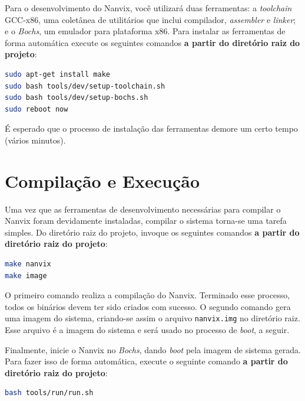 \documentclass[11pt]{article}
\begin{document}
Para o desenvolvimento do Nanvix, você utilizará duas ferramentas: a \textit{toolchain} GCC-x86, uma coletânea de utilitários que inclui compilador, \textit{assembler} e \textit{linker}; e o \textit{Bochs}, um emulador para plataforma x86. Para instalar as ferramentas de forma automática execute os seguintes comandos \textbf{a partir do diretório raiz do projeto}: \\

\begin{lstlisting}[language=bash,numbers=none,frame=single]
sudo apt-get install make
sudo bash tools/dev/setup-toolchain.sh
sudo bash tools/dev/setup-bochs.sh
sudo reboot now
\end{lstlisting}

É esperado que o processo de instalação das ferramentas demore um certo tempo (vários minutos).

\section{Compilação e Execução}
\label{sec:compilacao}

Uma vez que as ferramentas de desenvolvimento necessárias para compilar o Nanvix foram devidamente instaladas, compilar o sistema torna-se uma tarefa simples. Do diretório raiz do projeto, invoque os seguintes comandos \textbf{a partir do diretório raiz do projeto}:\\

\begin{lstlisting}[language=bash,numbers=none,frame=single]
make nanvix
make image
\end{lstlisting}

O primeiro comando realiza a compilação do Nanvix. Terminado esse processo, todos os binários devem ter sido criados com sucesso. O segundo comando gera uma imagem do sistema, criando-se assim o arquivo \texttt{nanvix.img} no diretório raiz. Esse arquivo é a imagem do sistema e será usado no processo de \textit{boot}, a seguir.

Finalmente, inicie o Nanvix no \textit{Bochs}, dando \textit{boot} pela imagem de sistema gerada. Para fazer isso de forma automática, execute o seguinte comando \textbf{a partir do diretório raiz do projeto}:\\

\begin{lstlisting}[language=bash,numbers=none,frame=single]
bash tools/run/run.sh
\end{lstlisting}
\end{document}
